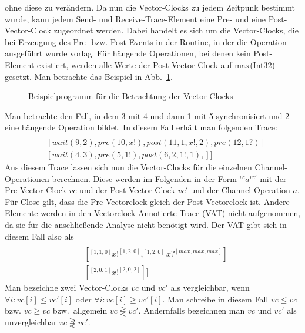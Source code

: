 ohne diese zu verändern. Da nun die Vector-Clocks zu jedem Zeitpunk bestimmt wurde, kann jedem 
Send- und Receive-Trace-Element eine Pre- und eine Post-Vector-Clock zugeordnet werden. 
Dabei handelt es sich um die Vector-Clocks, die bei Erzeugung des Pre- bzw. Post-Events in 
der Routine, in der die Operation ausgeführt wurde vorlag. Für hängende Operationen, 
bei denen kein Post-Element existiert, werden alle Werte der Post-Vector-Clock auf 
max(Int32) gesetzt.
Man betrachte das Beispiel in Abb.~\ref{Chap:Analyze-Sec:Channel-SubSec:Dangling-Fig:PorgVC}.
\begin{figure}[h!]
  \centering
  
  \caption{Beispielprogramm für die Betrachtung der Vector-Clocks}
  \label{Chap:Analyze-Sec:Channel-SubSec:Dangling-Fig:PorgVC}
\end{figure}
Man betrachte den Fall, in dem 3 mit 4 und dann 1 mit 5 synchronisiert und 2 eine hängende Operation bildet.
In diesem Fall erhält man folgenden Trace:
\begin{align*}
  [&[signal(1, 2), signal(2, 3), pre(1, x?), post(7, 1, x?, 6, 1), pre(8, x?), post(13, 1, x?, 11, 2)]\\
  &[wait(9, 2), pre(10, x!), post(11, 1, x!, 2), pre(12, 1?)]\\
  &[wait(4, 3), pre(5, 1!), post(6, 2, 1!, 1),]
  ]
\end{align*}
Aus diesem Trace lassen sich nun die Vector-Clocks für die einzelnen Channel-Operationen berechnen.
Diese werden im Folgenden in der Form $^{vc}a^{vc'}$ mit der Pre-Vector-Clock $vc$ und der 
Post-Vector-Clock $vc'$ und der Channel-Operation $a$. Für Close gilt, 
dass die Pre-Vectorclock gleich der Post-Vectorclock ist. Andere Elemente 
werden in den Vectorclock-Annotierte-Trace (VAT) nicht aufgenommen, da sie 
für die anschließende Analyse nicht benötigt wird.
Der 
VAT gibt sich in diesem Fall also als
\begin{align*}
  [&[^{[2,0,0]}x?^{[3,0,2]}, ^{[3,0,2]}x?^{[4,2,2]}]\\
  &[^{[1, 1, 0]}x!^{[1, 2, 0]}, ^{[1, 2, 0]}x?^{[max, max, max]}]\\
  &[^{[2, 0, 1]}x!^{[2, 0, 2]}]]
\end{align*}
Man bezeichne zwei Vector-Clocks $vc$ und $vc'$ als vergleichbar, wenn
$\forall i: vc[i] \leq vc'[i]$ oder $\forall i: vc[i] \geq vc'[i]$. Man 
schreibe in diesem Fall $vc \leq vc$ bzw. $vc \geq vc$ bzw.~allgemein 
$vc \gtreqless vc'$. Andernfalls 
bezeichnen man $vc$ und $vc'$ als unvergleichbar $vc \not\gtreqless vc'$. 
